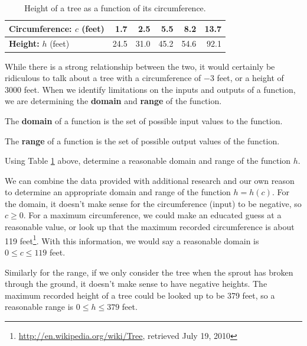 \begin{table}[ht!]
\begin{centering}
\begin{tabular}{l*{5}{r}}
\toprule
{\bf Circumference:} $c$ (feet) & 1.7 & 2.5 & 5.5 & 8.2 & 13.7\tabularnewline
\midrule
{\bf Height:} $h$ (feet) & 24.5 & 31.0 & 45.2 & 54.6 & 92.1\tabularnewline
\bottomrule
\end{tabular}
\caption{Height of a tree as a function of its circumference.}
\label{tab:1-tree}
\end{centering}
\end{table}
While there is a strong relationship between the two, it would certainly
be ridiculous to talk about a tree with a circumference of $-3$ feet, or a
height of $3000$ feet. When we identify limitations on the inputs and
outputs of a function, we are determining the {\bf domain} and {\bf range} of the function.

\begin{definition}
The {\bf domain} of a function is the set of possible input values to the function.

The {\bf range} of a function is the set of possible output values of the function.
\end{definition}

\begin{example}
Using Table \ref{tab:1-tree} above, determine a reasonable domain and range of the function $h$.

\solution We can combine the data provided with additional research and our own reason
to determine an appropriate domain and range of the function $h = h(c)$. For
the domain, it doesn't make sense for the circumference (input) to be negative, so $c \ge 0$. For a maximum circumference, we could make an educated guess at a reasonable value, or
look up that the maximum recorded circumference is about 119
feet\footnote{\url{http://en.wikipedia.org/wiki/Tree}, retrieved July
  19, 2010}. With this information, we would say a reasonable domain is $0\le c \le 119$ feet.

Similarly for the range, if we only consider the tree when the sprout has broken through the ground, it doesn't make sense to have negative heights. The maximum recorded height of a tree could be looked up to be 379 feet, so a reasonable range is $0\le h\le 379$ feet.
\end{example}

